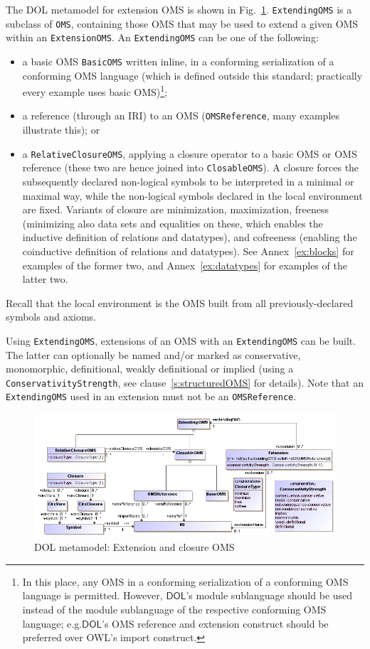 \documentclass[10pt, a4paper]{isov2}
\makeatletter
\newcommand*{\eg}{e.g.\@\xspace}
\newcommand*{\syntax}[1]{\texttt{#1}}
\newcommand*{\DOL}{\ensuremath{\mathsf{DOL}}\xspace}
\makeatother
\begin{document}
The DOL metamodel for extension OMS is shown in Fig.~\ref{fig:extension&closure}.
\syntax{ExtendingOMS} is a subclass of \syntax{OMS}, containing
those OMS that may be used to extend a given OMS within an \syntax{ExtensionOMS}.
An \syntax{ExtendingOMS} can be one of the following:
\begin{itemize}
\item a basic OMS \syntax{BasicOMS} written inline, in a conforming serialization of a conforming OMS 
language (which is defined outside this standard; practically every example uses basic OMS)\footnote{In this place, any OMS in a conforming serialization of a conforming OMS language is permitted.  
However, \DOL's module sublanguage should be used instead of the module sublanguage of 
the respective conforming OMS language; \eg \DOL's OMS reference and extension construct should be preferred over OWL's import construct.};
\item a reference (through an IRI) to an OMS (\syntax{OMSReference}, many examples illustrate this); or
\item a \syntax{RelativeClosureOMS}, applying a closure operator to a
  basic OMS or OMS reference (these two are hence joined into
  \syntax{ClosableOMS}). A closure forces the subsequently declared
  non-logical symbols to be interpreted in a minimal  or
  maximal way, while the non-logical symbols declared  in
  the local environment are fixed. Variants of closure are
  minimization, maximization, freeness (minimizing also data
  sets and equalities on these,  which enables the inductive
  definition of relations and datatypes), and cofreeness (enabling the
  coinductive definition of relations and datatypes).
  See Annex~\ref{ex:blocks} for examples of the former two, and
  Annex~\ref{ex:datatypes} for examples of the latter two.
\end{itemize}
Recall that the local environment is the OMS built from all
previously-declared symbols and axioms.

Using \syntax{ExtendingOMS}, extensions of an OMS with an \syntax{ExtendingOMS}
can be built. The latter can optionally be named and/or marked as conservative, monomorphic, definitional, weakly definitional or implied (using a \syntax{ConservativityStrength}, see clause~\ref{s:structuredOMS} for details).
Note that an \syntax{ExtendingOMS} used in an extension must
not be an \syntax{OMSReference}.

\medskip
\begin{figure}
  \centering
    \includegraphics[scale=0.47]{mof/extension&closure.png}
  \caption{DOL metamodel: Extension and closure OMS}
  \label{fig:extension&closure}
\end{figure}
\end{document}
